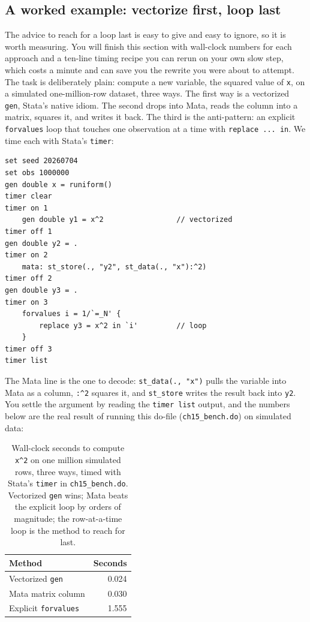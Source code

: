 \documentclass[
    a4paper,
    fontsize=10pt,
    twoside=true,
    numbers=noenddot,
]{kaobook}
\begin{document}
\subsection{A worked example: vectorize first, loop last}\label{sec:bench}
The advice to reach for a loop last is easy to give and easy to ignore, so it is worth measuring. You will finish this section with wall-clock numbers for each approach and a ten-line timing recipe you can rerun on your own slow step, which costs a minute and can save you the rewrite you were about to attempt. The task is deliberately plain: compute a new variable, the squared value of \texttt{x}, on a simulated one-million-row dataset, three ways. The first way is a vectorized \texttt{gen}, Stata's native idiom. The second drops into Mata, reads the column into a matrix, squares it, and writes it back. The third is the anti-pattern: an explicit \texttt{forvalues} loop that touches one observation at a time with \texttt{replace ... in}. We time each with Stata's \texttt{timer}:
\par
{\footnotesize
\begin{verbatim}
set seed 20260704
set obs 1000000
gen double x = runiform()
timer clear
timer on 1
    gen double y1 = x^2                 // vectorized
timer off 1
gen double y2 = .
timer on 2
    mata: st_store(., "y2", st_data(., "x"):^2)
timer off 2
gen double y3 = .
timer on 3
    forvalues i = 1/`=_N' {
        replace y3 = x^2 in `i'         // loop
    }
timer off 3
timer list
\end{verbatim}
}
The Mata line is the one to decode: \texttt{st\_data(., "x")} pulls the variable into Mata as a column, \texttt{:\^{}2} squares it, and \texttt{st\_store} writes the result back into \texttt{y2}.
You settle the argument by reading the \texttt{timer list} output, and the numbers below are the real result of running this do-file (\texttt{ch15\_bench.do}) on simulated data:

\begin{table}[htbp]
\centering
\caption[Three ways to build one variable, one million rows]{Wall-clock seconds to compute \texttt{x\textasciicircum 2} on one million simulated rows, three ways, timed with Stata's \texttt{timer} in \texttt{ch15\_bench.do}. Vectorized \texttt{gen} wins; Mata beats the explicit loop by orders of magnitude; the row-at-a-time loop is the method to reach for last.}
\label{tab:matabench}
\begin{tabular}{lr}
\hline
Method                       & Seconds \\
\hline
Vectorized \texttt{gen}      & 0.024 \\
Mata matrix column           & 0.030 \\
Explicit \texttt{forvalues}  & 1.555 \\
\hline
\end{tabular}
\end{table}
\end{document}
